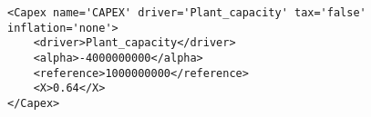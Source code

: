 \begin{lstlisting}[style=XML,morekeywords={anAttribute},caption=CashFlow input example., label=lst:CashFlowExample]
<Capex name='CAPEX' driver='Plant_capacity' tax='false' inflation='none'>
    <driver>Plant_capacity</driver>
    <alpha>-4000000000</alpha>
    <reference>1000000000</reference>
    <X>0.64</X>
</Capex>
\end{lstlisting}
